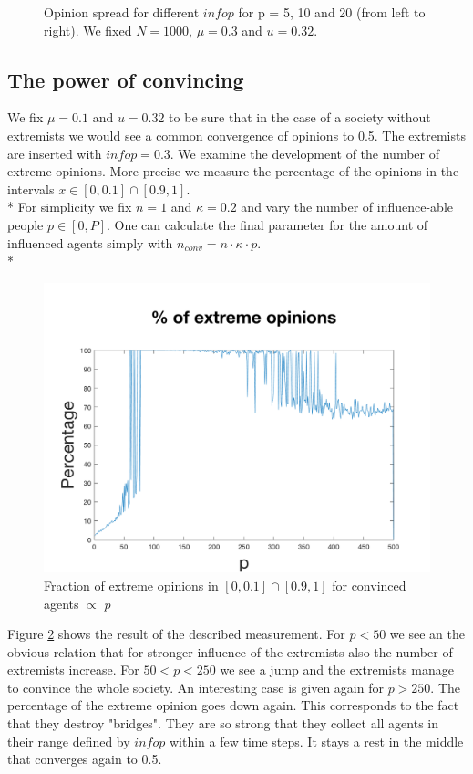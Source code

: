 \documentclass[11pt]{article}
\begin{document}
\begin{figure}[!htb]
\caption{Opinion spread for different $infop$ for p = 5, 10 and 20 (from left to right). We fixed $N = 1000$, $\mu = 0.3$ and $u = 0.32$.}
\label{fig:varinfop}
\end{figure}



\subsection{The power of convincing}
We fix $\mu = 0.1$ and $u = 0.32$ to be sure that in the case of a society without extremists we would see a common convergence of opinions to 0.5. The extremists are inserted with $infop = 0.3$. We examine the development of the number of extreme opinions. More precise we measure the percentage of the opinions in the intervals $x \in [0, 0.1] \cap [0.9, 1]$. \\*
For simplicity we fix $n = 1$ and $\kappa = 0.2$ and vary the number of influence-able people $p \in [0,P]$. One can calculate the final parameter for the amount of influenced agents simply with $n_{conv} = n\cdot\kappa\cdot p$. \\*

\begin{figure}[!htb]
\center

  \includegraphics[width=0.6\linewidth]{gen_plot_intervall_201712182172720605e+01.png}
  \caption{Fraction of extreme opinions in $[0, 0.1] \cap [0.9, 1]$ for convinced agents $\propto$ $p$}
  \label{fig:varynconv}
\end{figure}

Figure \ref{fig:varynconv} shows the result of the described measurement. For $p < 50$ we see an the obvious relation that for stronger influence of the extremists also the number of extremists increase. For $50 < p < 250$ we see a jump and the extremists manage to convince the whole society. An interesting case is given again for $p > 250$. The percentage of the extreme opinion goes down again. This corresponds to the fact that they destroy "bridges". They are so strong that they collect all agents in their range defined by $infop$ within a few time steps. It stays a rest in the middle that converges again to 0.5.
\end{document}
